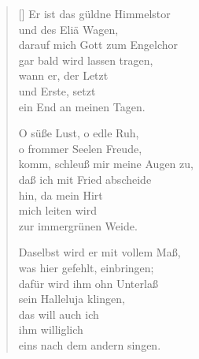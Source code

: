 \begin{multicols}{2}
\begin{verse}[\versewidth]
 Er ist das güldne Himmelstor\\
und des Eliä Wagen,\\
darauf mich Gott zum Engelchor\\
gar bald wird lassen tragen,\\
wann er, der Letzt\\
und Erste, setzt\\
ein End an meinen Tagen.

 O süße Lust, o edle Ruh,\\
o frommer Seelen Freude,\\
komm, schleuß mir meine Augen zu,\\
daß ich mit Fried abscheide\\
hin, da mein Hirt\\
mich leiten wird\\
zur immergrünen Weide.

 Daselbst wird er mit vollem Maß,\\
was hier gefehlt, einbringen;\\
dafür wird ihm ohn Unterlaß\\
sein Halleluja klingen,\\
das will auch ich\\
ihm williglich\\
eins nach dem andern singen.

\end{verse}
\end{multicols}
